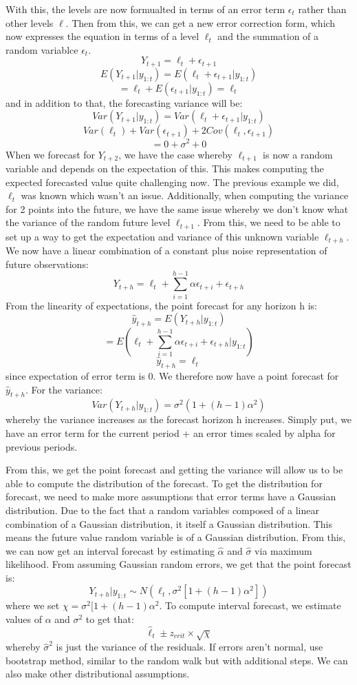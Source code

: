 \documentclass[11pt, oneside]{article}
\theoremstyle{definition}
\begin{document}
With this, the levels are now formualted in terms of an error term $\epsilon_t$ rather than other levels $\ell$. Then from this, we can get a new error correction form, which now expresses the equation in terms of a level $\ell_t$ and the summation of a random variablce $\epsilon_t$.
$$
Y_{t+1} = \ell_t + \epsilon_{t+1}
$$
$$
E(Y_{t+1}|y_{1:t}) = E(\ell_t + \epsilon_{t+1}|y_{1:t})
$$
$$
= \ell_t + E(\epsilon_{t+1}|y_{1:t}) = \ell_t
$$
and in addition to that, the forecasting variance will be:
$$
Var(Y_{t+1}|y_{1:t}) = Var(\ell_t + \epsilon_{t+1}|y_{1:t})
$$
$$
Var(\ell_t) + Var(\epsilon_{t+1}) + 2Cov(\ell_t,\epsilon_{t+1})
$$
$$
= 0 + \sigma^2 + 0
$$
When we forecast for $Y_{t+2}$, we have the case whereby $\ell_{t+1}$ is now a random variable and depends on the expectation of this. This makes computing the expected forecasted value quite challenging now. The previous example we did, $\ell_t$ was known which wasn't an issue. Additionally, when computing the variance for 2 points into the future, we have the same issue whereby we don't know what the variance of the random future level $\ell_{t+1}$. From this, we need to be able to set up a way to get the expectation and variance of this unknown variable $\ell_{t+h}$.
We now have a linear combination of a constant plus noise representation of future observations:
$$
Y_{t+h} = \ell_{t} + \sum\limits_{i=1}^{h-1}\alpha \epsilon_{t+i} + \epsilon_{t+h}
$$
From the linearity of expectations, the point forecast for any horizon h is:
$$
\hat{y}_{t+h} = E(Y_{t+h}|y_{1:t})
$$
$$
= E(\ell_t + \sum\limits_{i=1}^{h-1}\alpha \epsilon_{t+i} + \epsilon_{t+h}|y_{1:t})
$$
$$
\hat{y}_{t+h} = \ell_t
$$
since expectation of error term is 0. We therefore now have a point forecast for $\hat{y}_{t+h}$. For the variance:
$$
Var(Y_{t+h}|y_{1:t}) = \sigma^2 (1 + (h-1)\alpha^2)
$$
whereby the variance increases as the forecast horizon h increases. Simply put, we have an error term for the current period + an error times scaled by alpha for previous periods.

From this, we get the point forecast and getting the variance will allow us to be able to compute the distribution of the forecast. To get the distribution for forecast, we need to make more assumptions that error terms have a Gaussian distribution. Due to the fact that a random variables composed of a linear combination of a Gaussian distribution, it itself a Gaussian distribution. This means the future value random variable is of a Gaussian distribution. From this, we can now get an interval forecast by estimating $\hat{\alpha}$ and $\hat{\sigma}$ via maximum likelihood. From assuming Gaussian random errors, we get that the point forecast is:
$$
Y_{t+h}|y_{1:t} \sim N(\ell_t, \sigma^2[1+(h-1)\alpha^2])
$$
where we set $\chi = \sigma^2[1+(h-1)\alpha^2$. To compute interval forecast, we estimate values of $\alpha$ and $\sigma^2$ to get that:
$$
\hat{\ell}_t \pm z_{crit} \times \sqrt{\chi}
$$
whereby $\hat{\sigma}^2$ is just the variance of the residuals.
If errors aren't normal, use bootstrap method, similar to the random walk but with additional steps. We can also make other distributional assumptions.
\end{document}
